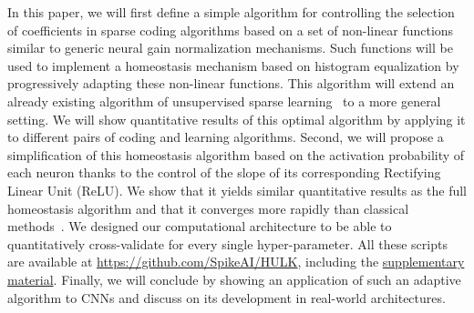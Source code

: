 \documentclass[vision,article,submit,oneauthor,pdftex]{Definitions/mdpi}
\newcommand{\Website}{https://spikeai.github.io/HULK}%
\begin{document}
In this paper, we will first define a simple algorithm for controlling the selection of coefficients in sparse coding algorithms based on a set of non-linear functions similar to generic neural gain normalization mechanisms. Such functions will be used to implement a homeostasis mechanism based on histogram equalization by progressively adapting these non-linear functions. This algorithm will extend an already existing algorithm of unsupervised sparse learning~\citep{Perrinet10shl} to a more general setting. We will show quantitative results of this optimal algorithm by applying it to different pairs of coding and learning algorithms. Second, we will propose a simplification of this homeostasis algorithm based on the activation probability of each neuron thanks to the control of the slope of its corresponding Rectifying Linear Unit (ReLU). We show that it yields similar quantitative results as the full homeostasis algorithm and that it converges more rapidly than classical methods~\citep{Olshausen97, Sandin17}. We designed our computational architecture to be able to quantitatively cross-validate for every single hyper-parameter. All these scripts are available at \url{https://github.com/SpikeAI/HULK}, including the \href{\Website}{supplementary material}. %
Finally, we will conclude by showing an application of such an adaptive algorithm to CNNs and discuss on its development in real-world architectures.
%
%
\end{document}
